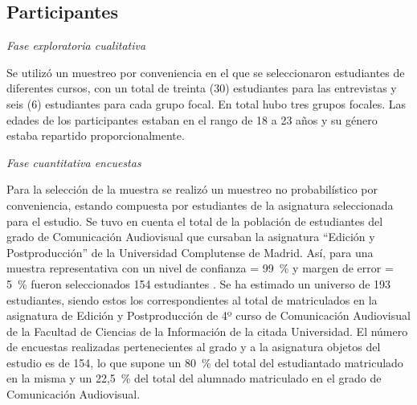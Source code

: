 \documentclass[spanish]{textolivre}
\begin{document}
\subsection{Participantes}\label{sec-conduta}
\textit{Fase exploratoria cualitativa} 

Se utilizó un muestreo por conveniencia en el que se seleccionaron estudiantes de diferentes cursos, con un total de treinta (30) estudiantes para las entrevistas y seis (6) estudiantes para cada grupo focal. En total hubo tres grupos focales. Las edades de los participantes estaban en el rango de 18 a 23 años y su género estaba repartido proporcionalmente.  

\textit{Fase cuantitativa encuestas}

Para la selección de la muestra se realizó un muestreo no probabilístico por conveniencia, estando compuesta por estudiantes de la asignatura seleccionada para el estudio. Se tuvo en cuenta el total de la población de estudiantes del grado de Comunicación Audiovisual que cursaban la asignatura “Edición y Postproducción” de la Universidad Complutense de Madrid. Así, para una muestra representativa con un nivel de confianza = 99~\% y margen de error = 5~\% fueron seleccionados 154 estudiantes \cite{sucasaire_pilco_orientaciones_2022,hernandez_sampieri_metodologiinvestigacion_2018}. Se ha estimado un universo de 193 estudiantes, siendo estos los correspondientes al total de matriculados en la asignatura de Edición y Postproducción de 4º curso de Comunicación Audiovisual de la Facultad de Ciencias de la Información de la citada Universidad. El número de encuestas realizadas pertenecientes al grado y a la asignatura objetos del estudio es de 154, lo que supone un 80~\% del total del estudiantado matriculado en la misma y un 22,5~\% del total del alumnado matriculado en el grado de Comunicación Audiovisual.
\end{document}
